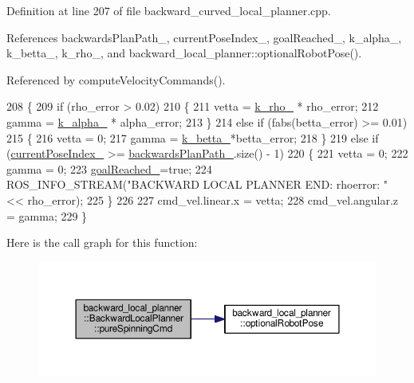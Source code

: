 Definition at line 207 of file backward\+\_\+curved\+\_\+local\+\_\+planner.\+cpp.



References backwards\+Plan\+Path\+\_\+, current\+Pose\+Index\+\_\+, goal\+Reached\+\_\+, k\+\_\+alpha\+\_\+, k\+\_\+betta\+\_\+, k\+\_\+rho\+\_\+, and backward\+\_\+local\+\_\+planner\+::optional\+Robot\+Pose().



Referenced by compute\+Velocity\+Commands().


\begin{DoxyCode}
208 \{
209     \textcolor{keywordflow}{if} (rho\_error > 0.02)
210     \{
211         vetta = \hyperlink{classbackward__local__planner_1_1BackwardLocalPlanner_a4060acf69c2590984eb87d8e04a82699}{k\_rho\_} * rho\_error;
212         gamma = \hyperlink{classbackward__local__planner_1_1BackwardLocalPlanner_ab8a4ea2b7fe9f21c07acac7121d4dd3e}{k\_alpha\_} * alpha\_error;
213     \}
214     \textcolor{keywordflow}{else} \textcolor{keywordflow}{if} (fabs(betta\_error) >= 0.01)
215     \{
216         vetta = 0;
217         gamma = \hyperlink{classbackward__local__planner_1_1BackwardLocalPlanner_a655def0b0657ac145737cd72229ad82a}{k\_betta\_}*betta\_error;
218     \}
219     \textcolor{keywordflow}{else} \textcolor{keywordflow}{if} (\hyperlink{classbackward__local__planner_1_1BackwardLocalPlanner_af2485562720c0ce3c895debdbdfc89f3}{currentPoseIndex\_}  >= \hyperlink{classbackward__local__planner_1_1BackwardLocalPlanner_aaa37c16e1735cb440986b3d41e6ef8e6}{backwardsPlanPath\_}.size() - 1)
220     \{
221         vetta = 0;
222         gamma = 0;
223         \hyperlink{classbackward__local__planner_1_1BackwardLocalPlanner_a42fdfaf0d3eb1edb71a225ec7caf62d0}{goalReached\_}=\textcolor{keyword}{true};
224         ROS\_INFO\_STREAM(\textcolor{stringliteral}{"BACKWARD LOCAL PLANNER END: rhoerror: "} << rho\_error);
225     \}
226 
227     cmd\_vel.linear.x = vetta;
228     cmd\_vel.angular.z = gamma;
229 \}
\end{DoxyCode}


Here is the call graph for this function\+:
\nopagebreak
\begin{figure}[H]
\begin{center}
\leavevmode
\includegraphics[width=350pt]{classbackward__local__planner_1_1BackwardLocalPlanner_af8ae130a16e3f7f5d4044d92982ee073_cgraph}
\end{center}
\end{figure}




